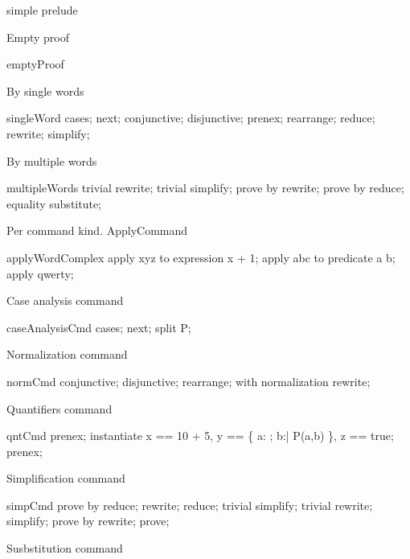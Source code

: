 \begin{zsection}
   \SECTION simple \parents prelude
\end{zsection}

Empty proof

\begin{zproof}{emptyProof}
\end{zproof}

By single words

\begin{zproof}{singleWord}
cases;
next;
conjunctive;
disjunctive;
prenex;
rearrange;
reduce;
rewrite;
simplify;
\end{zproof}

By multiple words

\begin{zproof}{multipleWords}
trivial rewrite;
trivial simplify;
prove by rewrite;
prove by reduce;
equality substitute;
\end{zproof}

Per command kind. ApplyCommand

\begin{zproof}{applyWordComplex}
apply xyz to expression x + 1;
apply abc to predicate a \in b;
apply qwerty;
\end{zproof}

Case analysis command

\begin{zproof}{caseAnalysisCmd}
cases;
next;
split P;
\end{zproof}

Normalization command

\begin{zproof}{normCmd}
conjunctive;    %
disjunctive;
rearrange;
with normalization rewrite;
\end{zproof}

Quantifiers command

\begin{zproof}{qntCmd}
prenex;
instantiate x == 10 + 5, y == \{ a: \nat; b:\nat | P(a,b) \},
    z == true;
prenex;
\end{zproof}

Simplification command

\begin{zproof}{simpCmd}
prove by reduce;
rewrite;
reduce;
trivial simplify;
trivial rewrite;
simplify;
prove by rewrite;
prove;
\end{zproof}

Susbstitution command

